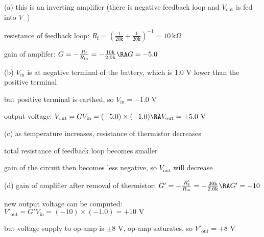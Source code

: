 \solc \begin{compactitem}
	\item[(a)] this is an inverting amplifier (there is negative feedback loop and $V_\text{out}$ is fed into $V_-$)
	
	resistance of feedback loop: $R_\text{f} = \left(\frac{1}{20\text{k}} + \frac{1}{20\text{k}}\right)^{-1} = 10 \, \text{k}\Omega$
	
	\eqyskip gain of amplifer: $G= - \frac{R_\text{f}}{R_\text{in}} = -\frac{10\text{k}}{2.0\text{k}} \RA G=-5.0$
	
	\item[(b)] $V_\text{in}$ is at negative terminal of the battery, which is 1.0 V lower than the positive terminal
	
	but positive terminal is earthed, so $V_\text{in} = -1.0 \text{ V}$
	
	output voltage: $V_\text{out} = GV_\text{in} = (-5.0) \times (-1.0) \RA V_\text{out} = +5.0 \text{ V}$
	
	\item[(c)] as temperature increases, resistance of thermistor decreases
	
	total resistance of feedback loop becomes smaller
	
	gain of the circuit then becomes less negative, so $V_\text{out}$ will decrease
	
	\item[(d)] gain of amplifier after removal of thermistor: $G' = - \frac{R'_\text{f}}{R_\text{in}} = - \frac{20\text{k}}{2.0\text{k}} \RA G' = -10$
	
	new output voltage can be computed: $V'_\text{out} = G'V_\text{in} = (-10)\times(-1.0) = +10 \text{ V}$
	
	but voltage supply to op-amp is $\pm 8 \text{ V}$, op-amp saturates, so $V'_\text{out} = +8 \text{ V}$ \eoe
\end{compactitem}


